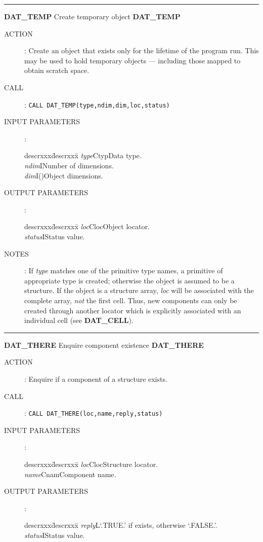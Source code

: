 \goodbreak
\rule{\textwidth}{0.3mm}
{\Large {\bf DAT\_TEMP} \hfill Create temporary object \hfill {\bf DAT\_TEMP}}
\begin{description}
\item [ACTION]:
Create an object that exists only for the lifetime of the program run.
This may be used to hold temporary objects --- including those mapped to obtain
scratch space.
\item [CALL]:
{\tt CALL DAT\_TEMP(type,ndim,dim,loc,status)}
\item [INPUT PARAMETERS]:
\begin{tabbing}
descrxxx\=descrxxx\=\kill
{\em type}\>Ctyp\>Data type.\\
{\em ndim}\>I\>Number of dimensions.\\
{\em dim}\>I()\>Object dimensions.
\end{tabbing}
\item [OUTPUT PARAMETERS]:
\begin{tabbing}
descrxxx\=descrxxx\=\kill
{\em loc}\>Cloc\>Object locator.\\
{\em status}\>I\>Status value.
\end{tabbing}
\item [NOTES]:
If {\em type} matches one of the primitive type names, a primitive of
appropriate type is created; otherwise the object is assumed to be a structure.
If the object is a structure array, {\em loc} will be associated with the
complete array, {\em not} the first cell.
Thus, new components can only be created through another locator which
is explicitly associated with an individual cell (see {\bf DAT\_CELL}).
\end{description}
\goodbreak
\rule{\textwidth}{0.3mm}
{\Large {\bf DAT\_THERE} \hfill Enquire component existence \hfill {\bf DAT\_THERE}}
\begin{description}
\item [ACTION]:
Enquire if a component of a structure exists.
\item [CALL]:
{\tt CALL DAT\_THERE(loc,name,reply,status)}
\item [INPUT PARAMETERS]:
\begin{tabbing}
descrxxx\=descrxxx\=\kill
{\em loc}\>Cloc\>Structure locator.\\
{\em name}\>Cnam\>Component name.
\end{tabbing}
\item [OUTPUT PARAMETERS]:
\begin{tabbing}
descrxxx\=descrxxx\=\kill
{\em reply}\>L\>`.TRUE.' if exists, otherwise `.FALSE.'.\\
{\em status}\>I\>Status value.
\end{tabbing}
\end{description}
